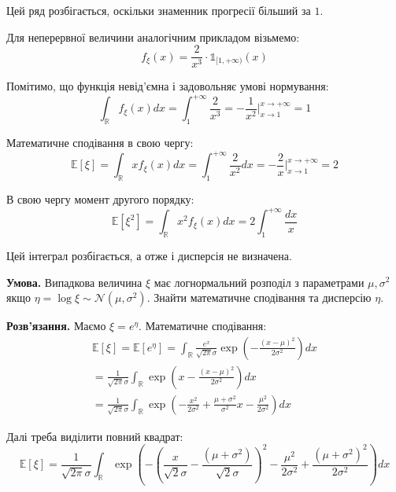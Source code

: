 \documentclass[oneside,solution]{karazin-prob-theory-assign}
\begin{document}
Цей ряд розбігається, оскільки знаменник прогресії більший за $1$.

Для неперервної величини аналогічним прикладом візьмемо:
\begin{equation}
    f_{\xi}(x) = \frac{2}{x^3} \cdot \mathds{1}_{[1,+\infty)}(x)
\end{equation}

Помітимо, що функція невід'ємна і задовольняє умові нормування:
\begin{equation}
    \int_{\mathbb{R}}f_{\xi}(x)dx = \int_{1}^{+\infty} \frac{2}{x^3} = -\frac{1}{x^2}\Big|_{x \to 1}^{x \to +\infty} = 1
\end{equation}

Математичне сподівання в свою чергу:
\begin{equation}
    \mathbb{E}[\xi] = \int_{\mathbb{R}}xf_{\xi}(x)dx = \int_1^{+\infty} \frac{2}{x^2}dx = -\frac{2}{x}\Big|_{x \to 1}^{x \to +\infty} = 2
\end{equation}

В свою чергу момент другого порядку:
\begin{equation}
    \mathbb{E}[\xi^2] = \int_{\mathbb{R}}x^2f_{\xi}(x)dx = 2\int_1^{+\infty}\frac{dx}{x}
\end{equation}

Цей інтеграл розбігається, а отже і дисперсія не визначена.


\hspace{20px}\textbf{Умова.} Випадкова величина $\xi$ має логнормальний розподіл з параметрами $\mu,\sigma^2$ якщо $\eta=\log \xi \sim \mathcal{N}(\mu,\sigma^2)$. Знайти математичне сподівання та дисперсію $\eta$.

\textbf{Розв'язання.} Маємо $\xi = e^{\eta}$. Математичне сподівання:
\begin{gather}
    \mathbb{E}[\xi] = \mathbb{E}[e^{\eta}] = \int_{\mathbb{R}}\frac{e^x}{\sqrt{2\pi}\sigma}\exp\left(-\frac{(x-\mu)^2}{2\sigma^2}\right)dx \nonumber \\
    = \frac{1}{\sqrt{2\pi}\sigma}\int_{\mathbb{R}}\exp\left(x-\frac{(x-\mu)^2}{2\sigma^2}\right)dx \nonumber \\
    =\frac{1}{\sqrt{2\pi}\sigma}\int_{\mathbb{R}}\exp\left(-\frac{x^2}{2\sigma^2} + \frac{\mu + \sigma^2}{\sigma^2}x - \frac{\mu^2}{2\sigma^2}\right)dx
\end{gather}

Далі треба виділити повний квадрат:
\begin{equation}
    \mathbb{E}[\xi] = \frac{1}{\sqrt{2\pi}\sigma}\int_{\mathbb{R}}\exp\left(-\left(\frac{x}{\sqrt{2}\sigma} - \frac{(\mu+\sigma^2)}{\sqrt{2}\sigma}\right)^2 - \frac{\mu^2}{2\sigma^2} + \frac{(\mu+\sigma^2)^2}{2\sigma^2}\right)dx
\end{equation}
\end{document}
